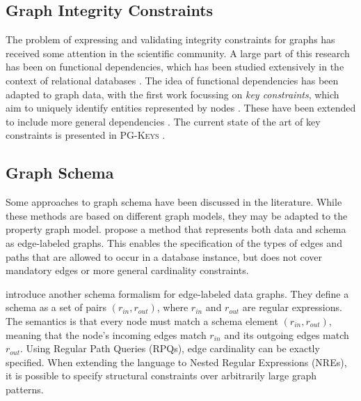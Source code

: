 \documentclass{article}
\theoremstyle{definition}
\begin{document}
\subsection{Graph Integrity Constraints}


The problem of expressing and validating integrity constraints for graphs has received some attention in the scientific community. A large part of this research has been on functional dependencies, which has been studied extensively in the context of relational databases \citep{fagin1984theory,abiteboul1999data}. The idea of functional dependencies has been adapted to graph data, with the first work focussing on \emph{key constraints}, which aim to uniquely identify entities represented by nodes \citep{fan2015keys}. These have been extended to include more general dependencies \citep{fan2016functional}. The current state of the art of key constraints is presented in \textsc{PG-Keys} \citep{angles2021keys}.


\subsection{Graph Schema}

Some approaches to graph schema have been discussed in the literature. While these methods are based on different graph models, they may be adapted to the property graph model. \citet{buneman1997adding} propose a method that represents both data and schema as edge-labeled graphs. This enables the specification of the types of edges and paths that are allowed to occur in a database instance, but does not cover mandatory edges or more general cardinality constraints.

\citet{colazzo2015typing} introduce another schema formalism for edge-labeled data graphs. They define a schema as a set of pairs $(r_{in}, r_{out})$, where $r_{in}$ and $r_{out}$ are regular expressions. The semantics is that every node must match a schema element $(r_{in}, r_{out})$, meaning that the node's incoming edges match $r_{in}$ and its outgoing edges match $r_{out}$. Using Regular Path Queries (RPQs), edge cardinality can be exactly specified. When extending the language to Nested Regular Expressions (NREs), it is possible to specify structural constraints over arbitrarily large graph patterns.
\end{document}
